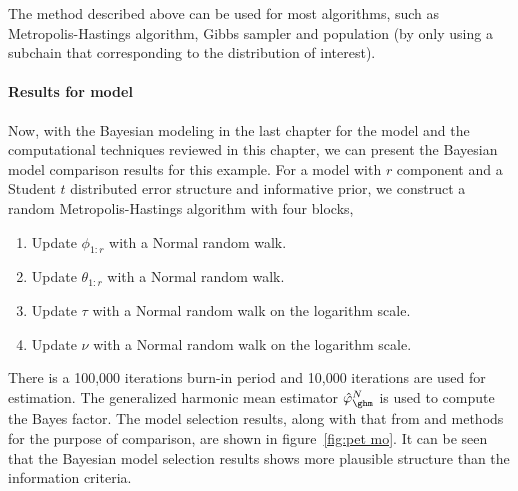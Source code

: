 The method described above can be used for most \mcmc algorithms, such as
Metropolis-Hastings algorithm, Gibbs sampler and population \mcmc (by only
using a subchain that corresponding to the distribution of interest).

\paragraph{Results for \pet model}

Now, with the Bayesian modeling in the last chapter for the \pet model and the
computational techniques reviewed in this chapter, we can present the Bayesian
model comparison results for this example. For a \pet model with $r$ component
and a Student $t$ distributed error structure and informative prior, we
construct a random Metropolis-Hastings algorithm with four blocks,
\begin{enumerate}
  \item Update $\phi_{1:r}$ with a Normal random walk.
  \item Update $\theta_{1:r}$ with a Normal random walk.
  \item Update $\tau$ with a Normal random walk on the logarithm scale.
  \item Update $\nu$ with a Normal random walk on the logarithm scale.
\end{enumerate}
There is a 100,000 iterations burn-in period and 10,000 iterations are used
for estimation. The generalized harmonic mean estimator $\hat\varphi_{\ghm}^N$
is used to compute the Bayes factor. The model selection results, along with
that from \aic and \bic methods for the purpose of comparison, are shown in
figure~\ref{fig:pet mo}. It can be seen that the Bayesian model selection
results shows more plausible structure than the information criteria.

